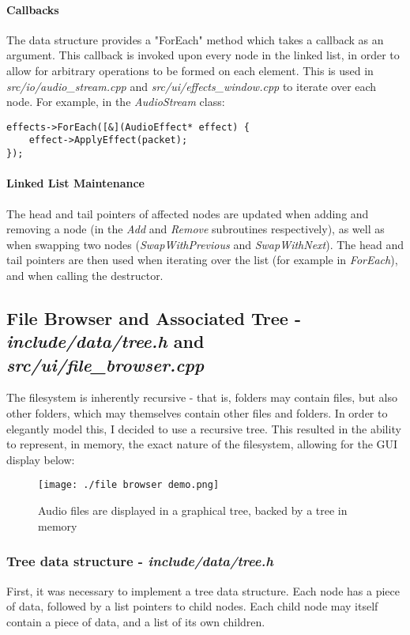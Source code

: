 \paragraph{Callbacks} The data structure provides a "ForEach" method which takes a callback as an argument. This callback is invoked upon every node in the linked list, in order to allow for arbitrary operations to be formed on each element. This is used in \textit{src/io/audio\_stream.cpp} and \textit{src/ui/effects\_window.cpp} to iterate over each node. For example, in the \textit{AudioStream} class:
\begin{verbatim}
effects->ForEach([&](AudioEffect* effect) {
	effect->ApplyEffect(packet);
});
\end{verbatim}

\paragraph{Linked List Maintenance}  The head and tail pointers of affected nodes are updated when adding and removing a node (in the \textit{Add} and \textit{Remove} subroutines respectively), as well as when swapping two nodes (\textit{SwapWithPrevious} and \textit{SwapWithNext}). The head and tail pointers are then used when iterating over the list (for example in \textit{ForEach}), and when calling the destructor.


\pagebreak
\subsection{File Browser and Associated Tree - \textit{include/data/tree.h} and \textit{src/ui/file\_browser.cpp }}

The filesystem is inherently recursive - that is, folders may contain files, but also other folders, which may themselves contain other files and folders. In order to elegantly model this, I decided to use a recursive tree. This resulted in the ability to represent, in memory, the exact nature of the filesystem, allowing for the GUI display below:

\begin{figure}[h]
	\texttt{[image: ./file browser demo.png]}
	\caption{Audio files are displayed in a graphical tree, backed by a tree in memory}
\end{figure}

\subsubsection{Tree data structure - \textit{include/data/tree.h}}
First, it was necessary to implement a tree data structure. Each node has a piece of data, followed by a list pointers to child nodes. Each child node may itself contain a piece of data, and a list of its own children.

